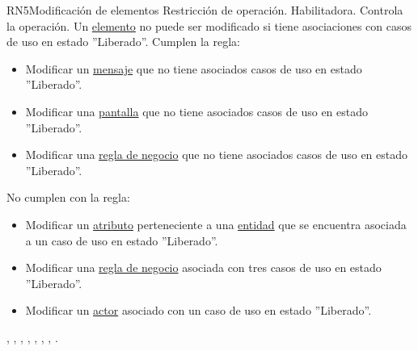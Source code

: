 \begin{BussinesRule}{RN5}{Modificación de elementos}
	\BRitem[Tipo:] Restricción de operación. 
	\BRitem[Clase:] Habilitadora. 
	\BRitem[Nivel:] Controla la operación. %
	\BRitem[Descripción:] Un \hyperlink{tElemento}{elemento} no puede ser modificado si tiene asociaciones con casos de uso en estado ''Liberado''.
	 Cumplen la regla:
	\begin{itemize}
		\item Modificar un \hyperlink{MSGEntidad}{mensaje} que no tiene asociados casos de uso en estado ''Liberado''.
		\item Modificar una \hyperlink{EntidadPantalla}{pantalla} que no tiene asociados casos de uso en estado ''Liberado''.
		\item Modificar una \hyperlink{BREntidad}{regla de negocio} que no tiene asociados casos de uso en estado ''Liberado''.
	\end{itemize}
	 No cumplen con la regla:
	\begin{itemize}
		\item Modificar un \hyperlink{atributoEntidad}{atributo} perteneciente a una \hyperlink{entidadEntidad}{entidad} que se encuentra asociada a un caso de uso en estado ''Liberado''.
		\item Modificar una \hyperlink{BREntidad}{regla de negocio} asociada con tres casos de uso en estado ''Liberado''.
		\item Modificar un \hyperlink{actorEntidad}{actor} asociado con un caso de uso en estado ''Liberado''.
	\end{itemize}
	 , , , , , , , .
\end{BussinesRule}



